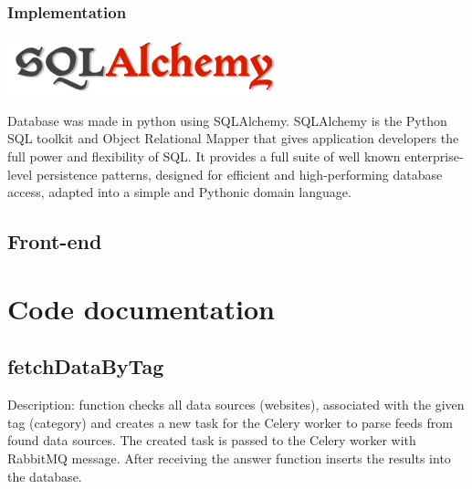 \documentclass[12pt]{article}
\begin{document}
\subsubsection{Implementation}

\includegraphics{images/sqla.png}

Database was made in python using SQLAlchemy. SQLAlchemy is the Python SQL toolkit and Object Relational Mapper that gives application developers the full power and flexibility of SQL. It provides a full suite of well known enterprise-level persistence patterns, designed for efficient and high-performing database access, adapted into a simple and Pythonic domain language.~\cite{wiki:sqlalchemy}




\subsection{Front-end}

\section{Code documentation}

\subsection{fetchDataByTag}
Description: function checks all data sources (websites), associated with the given tag (category) and creates a new task for the Celery worker to parse feeds from found data sources. The created task is passed to the Celery worker with RabbitMQ message. After receiving the answer function inserts the results into the database.
\end{document}
